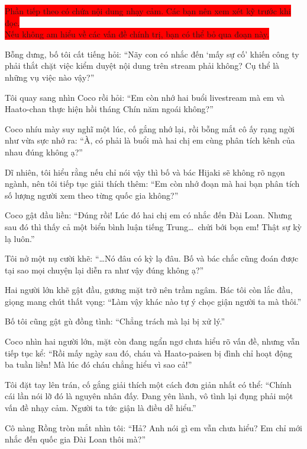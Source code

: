 \documentclass[../main.tex]{subfiles}
\begin{document}
\begin{center}
  \colorbox{red}{\color{white} Phần tiếp theo có chứa nội dung nhạy cảm. Các bạn nên xem xét kỹ trước khi đọc.}\\
  \colorbox{red}{\color{white} Nếu không am hiểu về các vấn đề chính trị, bạn có thể bỏ qua đoạn này.}
\end{center}

Bỗng dưng, bố tôi cất tiếng hỏi: ``Nãy con có nhắc đến `mấy sự cố' khiến công ty phải thắt chặt việc kiểm duyệt nội dung trên stream phải không? Cụ thể là những vụ việc nào vậy?''

Tôi quay sang nhìn Coco rồi hỏi: ``Em còn nhớ hai buổi livestream mà em và Haato-chan thực hiện hồi tháng Chín năm ngoái không?''

Coco nhíu mày suy nghĩ một lúc, cố gắng nhớ lại, rồi bỗng mắt cô ấy rạng ngời như vừa sực nhớ ra: ``À, có phải là buổi mà hai chị em cùng phân tích kênh của nhau đúng không ạ?''

Dĩ nhiên, tôi hiểu rằng nếu chỉ nói vậy thì bố và bác Hijaki sẽ không rõ ngọn ngành, nên tôi tiếp tục giải thích thêm: ``Em còn nhớ đoạn mà hai bạn phân tích số lượng người xem theo từng quốc gia không?''

Coco gật đầu liền: ``Đúng rồi! Lúc đó hai chị em có nhắc đến Đài Loan. Nhưng sau đó thì thấy cả một biển bình luận tiếng Trung\dots\ chửi bới bọn em! Thật sự kỳ lạ luôn.''

Tôi nở một nụ cười khẽ: ``\dots Nó đâu có kỳ lạ đâu. Bố và bác chắc cũng đoán được tại sao mọi chuyện lại diễn ra như vậy đúng không ạ?''

Hai người lớn khẽ gật đầu, gương mặt trở nên trầm ngâm. Bác tôi còn lắc đầu, giọng mang chút thất vọng: ``Làm vậy khác nào tự ý chọc giận người ta mà thôi.''

Bố tôi cũng gật gù đồng tình: ``Chẳng trách mà lại bị xử lý.''

Coco nhìn hai người lớn, mặt còn đang ngẩn ngơ chưa hiểu rõ vấn đề, nhưng vẫn tiếp tục kể: ``Rồi mấy ngày sau đó, cháu và Haato-paisen bị đình chỉ hoạt động ba tuần liền! Mà lúc đó cháu chẳng hiểu vì sao cả!''

Tôi đặt tay lên trán, cố gắng giải thích một cách đơn giản nhất có thể: ``Chính cái lần nói lỡ đó là nguyên nhân đấy. Đang yên lành, vô tình lại đụng phải một vấn đề nhạy cảm. Người ta tức giận là điều dễ hiểu.''

Cô nàng Rồng tròn mắt nhìn tôi: ``Hả? Anh nói gì em vẫn chưa hiểu? Em chỉ mới nhắc đến quốc gia Đài Loan thôi mà?''
\end{document}
